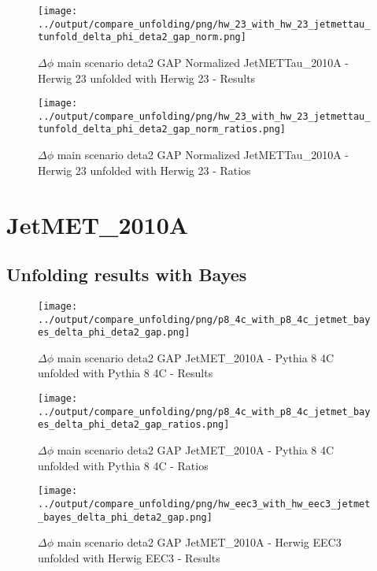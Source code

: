 \documentclass[11pt]{book}
\begin{document}
\begin{figure}[ht]
\centering
\texttt{[image: ../output/compare\_unfolding/png/hw\_23\_with\_hw\_23\_jetmettau\_tunfold\_delta\_phi\_deta2\_gap\_norm.png]}
\caption{$\Delta\phi$ main scenario deta2 GAP Normalized JetMETTau\_2010A - Herwig 23 unfolded with Herwig 23 - Results}
\label{hw_23_hw_23_jetmettau_tunfold_delta_phi_deta2_gap_norm_a}
\end{figure}

\begin{figure}[ht]
\centering
\texttt{[image: ../output/compare\_unfolding/png/hw\_23\_with\_hw\_23\_jetmettau\_tunfold\_delta\_phi\_deta2\_gap\_norm\_ratios.png]}
\caption{$\Delta\phi$ main scenario deta2 GAP Normalized JetMETTau\_2010A - Herwig 23 unfolded with Herwig 23 - Ratios}
\label{hw_23_hw_23_jetmettau_tunfold_delta_phi_deta2_gap_norm_b}
\end{figure}


\clearpage
\section{JetMET\_2010A}
\subsection{Unfolding results with Bayes}

\begin{figure}[ht]
\centering
\texttt{[image: ../output/compare\_unfolding/png/p8\_4c\_with\_p8\_4c\_jetmet\_bayes\_delta\_phi\_deta2\_gap.png]}
\caption{$\Delta\phi$ main scenario deta2 GAP JetMET\_2010A - Pythia 8 4C unfolded with Pythia 8 4C - Results}
\label{p8_p8_jetmet_bayes_delta_phi_deta2_gap_a}
\end{figure}

\begin{figure}[ht]
\centering
\texttt{[image: ../output/compare\_unfolding/png/p8\_4c\_with\_p8\_4c\_jetmet\_bayes\_delta\_phi\_deta2\_gap\_ratios.png]}
\caption{$\Delta\phi$ main scenario deta2 GAP JetMET\_2010A - Pythia 8 4C unfolded with Pythia 8 4C - Ratios}
\label{p8_p8_jetmet_bayes_delta_phi_deta2_gap_b}
\end{figure}

\begin{figure}[ht]
\centering
\texttt{[image: ../output/compare\_unfolding/png/hw\_eec3\_with\_hw\_eec3\_jetmet\_bayes\_delta\_phi\_deta2\_gap.png]}
\caption{$\Delta\phi$ main scenario deta2 GAP JetMET\_2010A - Herwig EEC3 unfolded with Herwig EEC3 - Results}
\label{hw_eec3_hw_eec3_jetmet_bayes_delta_phi_deta2_gap_a}
\end{figure}
\end{document}
